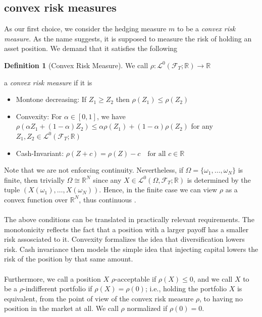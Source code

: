 \documentclass[11pt,a4paper,twoside,openany]{report}
\theoremstyle{plain} %
\theoremstyle{definition} %
\newtheorem{definition}[definition]{Definition}
\theoremstyle{remark} %
\let\parencite\authnumparencite
\begin{document}
\subsection{convex risk measures}
As our first choice, we consider the hedging measure \(m\) to be a \textit{convex risk measure}. As the name suggests, it is supposed to measure the risk of holding an asset position. We demand that it satisfies the following
\begin{definition}[Convex Risk Measure]
    We call \(\rho:\mathcal{L}^0(\mathcal{F}_T;\mathbb{R})\to\mathbb{R}\)
\end{definition} a \textit{convex risk measure} if it is
\begin{itemize}
    \item Montone decreasing: If \(Z_1\geq Z_2\) then \(\rho(Z_1)\leq\rho(Z_2)\)
    \item Convexity: For \(\alpha\in[0,1]\), we have \(\rho(\alpha Z_1+(1-\alpha)Z_2)\leq \alpha\rho(Z_1)+(1-\alpha)\rho(Z_2)\) for any \(Z_1,Z_2\in\mathcal{L}^0(\mathcal{F}_T;\mathbb{R})\) 
    \item Cash-Invariant: \(\rho(Z+c)=\rho(Z)-c \quad \text{for all } c\in\mathbb{R}\)
\end{itemize}
Note that we are not enforcing continuity. Nevertheless, if \(\Omega=\{\omega_1,\dots,\omega_N\}\) is finite, then trivially \(\Omega\cong \mathbb{R}^N\) since any \(X\in\mathcal{L}^0(\Omega,\mathcal{F}_T;\mathbb{R})\) is determined by the tuple \((X(\omega_1),\dots,X(\omega_N))\). Hence, in the finite case we can view \(\rho\) as a convex function over \(\mathbb{R}^N\), thus continuous \parencite[Thm.~10.1]{Rockafellar1970ConvexAnalysis}.
\\\\
The above conditions can be translated in practically relevant requirements. The monotonicity reflects the fact that a position with a larger payoff has a smaller risk assosciated to it. Convexity formalizes the idea that diversification lowers risk. Cash invariance then models the simple idea that injecting capital lowers the risk of the position by that same amount.
\\\\
Furthermore, we call a position \(X\) \(\rho\)-acceptable if \(\rho(X)\leq 0\), and we call \(X\) to be a \(\rho\)-indifferent portfolio if \(\rho(X) = \rho(0)\); i.e., holding the portfolio \(X\) is equivalent, from the point of view of the convex risk measure \(\rho\), to having no position in the market at all. We call \(\rho\) normalized if \(\rho(0)=0\).
\end{document}
